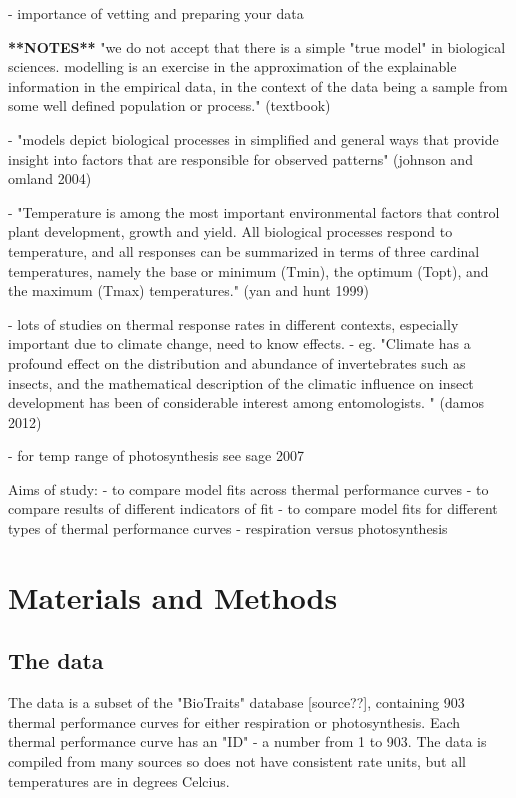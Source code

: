 \documentclass[11pt]{article}
\begin{document}
- importance of vetting and preparing your data

\textbf{**NOTES**}
"we do not accept that there is a simple "true model" in biological sciences. modelling is an exercise in the approximation of the explainable information in the empirical data, in the context of the data being a sample from some well defined population or process." (textbook)

	- "models depict biological processes in simplified and general ways that provide insight into factors that are responsible for observed patterns" (johnson and omland 2004)
	
	- "Temperature is among the most important environmental factors that control plant development, growth and yield. All biological processes respond to temperature, and all responses can be summarized in terms of three cardinal temperatures, namely the base or minimum (Tmin), the optimum (Topt), and the maximum (Tmax) temperatures." (yan and hunt 1999)
	
	- lots of studies on thermal response rates in different contexts, especially important due to climate change, need to know effects.
	- eg. "Climate has a profound effect on the distribution and abundance of invertebrates such as insects, and the mathematical description of the climatic influence on insect development has been of considerable interest among entomologists. " (damos 2012)
	
	- for temp range of photosynthesis see sage 2007
	
	Aims of study:
	- to compare model fits across thermal performance curves
	- to compare results of different indicators of fit
	- to compare model fits for different types of thermal performance curves - respiration versus photosynthesis
	
\section{Materials and Methods}
	
	\subsection{The data}
	The data is a subset of the "BioTraits" database [source??], containing 903 thermal performance curves for either respiration or photosynthesis. Each thermal performance curve has an "ID" - a number from 1 to 903. The data is compiled from many sources so does not have consistent rate units, but all temperatures are in degrees Celcius.
	
\end{document}
